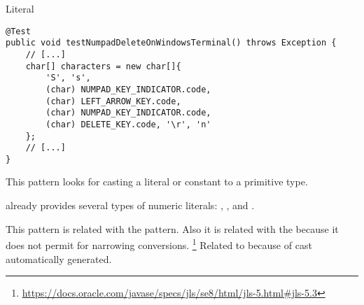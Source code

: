 \begin{pattern}{Literal}
\begin{verbatim}
@Test
public void testNumpadDeleteOnWindowsTerminal() throws Exception {
    // [...]
    char[] characters = new char[]{
        'S', 's',
        (char) NUMPAD_KEY_INDICATOR.code,
        (char) LEFT_ARROW_KEY.code,
        (char) NUMPAD_KEY_INDICATOR.code,
        (char) DELETE_KEY.code, '\r', 'n'
    };
    // [...]
}
\end{verbatim}

\detection{}
This pattern looks for casting a literal or constant to a primitive type.

\discussion{}
\java{} already provides several types of numeric literals:
, ,  and .

\related{}
This pattern is related with the  pattern.
Also it is related with the 
because it does not permit for narrowing conversions.%
\footnote{\url{https://docs.oracle.com/javase/specs/jls/se8/html/jls-5.html\#jls-5.3}}
Related to  because of cast automatically generated.
\end{pattern}